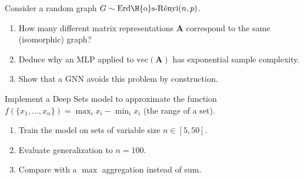 \begin{exercise}
Consider a random graph $G \sim \mathrm{Erd\H{o}s\text{-}R\acute{e}nyi}(n, p)$.
\begin{enumerate}
    \item How many different matrix representations $\mathbf{A}$ correspond to
          the same (isomorphic) graph?
    \item Deduce why an MLP applied to $\mathrm{vec}(\mathbf{A})$ has exponential
          sample complexity.
    \item Show that a GNN avoids this problem by construction.
\end{enumerate}
\end{exercise}

\begin{exercise}
Implement a Deep Sets model to approximate the function
$f(\{x_1, \ldots, x_n\}) = \max_i x_i - \min_i x_i$ (the range of a set).
\begin{enumerate}
    \item Train the model on sets of variable size $n \in [5, 50]$.
    \item Evaluate generalization to $n = 100$.
    \item Compare with a $\max$ aggregation instead of sum.
\end{enumerate}
\end{exercise}
